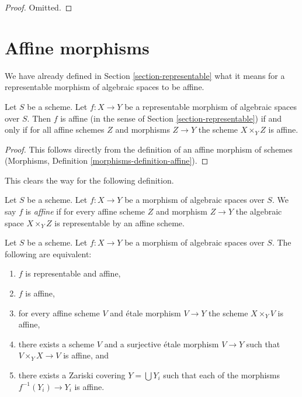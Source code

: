 \begin{proof}
Omitted.
\end{proof}











\section{Affine morphisms}
\label{section-affine}

\noindent
We have already defined in Section \ref{section-representable}
what it means for a representable morphism of algebraic spaces
to be affine.

\begin{lemma}
\label{lemma-affine-representable}
Let $S$ be a scheme. Let $f : X \to Y$ be a representable morphism
of algebraic spaces over $S$. Then
$f$ is affine (in the sense of Section \ref{section-representable})
if and only if for all affine schemes $Z$
and morphisms $Z \to Y$ the scheme $X \times_Y Z$ is affine.
\end{lemma}

\begin{proof}
This follows directly from the definition of an affine morphism of schemes
(Morphisms, Definition \ref{morphisms-definition-affine}).
\end{proof}

\noindent
This clears the way for the following definition.

\begin{definition}
\label{definition-affine}
Let $S$ be a scheme.
Let $f : X \to Y$ be a morphism of algebraic spaces over $S$.
We say $f$ is {\it affine} if for every affine scheme $Z$ and
morphism $Z \to Y$ the algebraic space $X \times_Y Z$ is representable
by an affine scheme.
\end{definition}

\begin{lemma}
\label{lemma-affine-local}
Let $S$ be a scheme.
Let $f : X \to Y$ be a morphism of algebraic spaces over $S$.
The following are equivalent:
\begin{enumerate}
\item $f$ is representable and affine,
\item $f$ is affine,
\item for every affine scheme $V$ and \'etale morphism $V \to Y$
the scheme $X \times_Y V$ is affine,
\item there exists a scheme $V$ and a surjective \'etale morphism
$V \to Y$ such that $V \times_Y X \to V$ is affine, and
\item there exists a Zariski covering $Y = \bigcup Y_i$ such
that each of the morphisms $f^{-1}(Y_i) \to Y_i$ is affine.
\end{enumerate}
\end{lemma}

